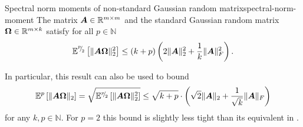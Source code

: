 \documentclass[12pt]{article}
\begin{document}
\begin{lemma}{Spectral norm moments of non-standard Gaussian random matrix}{spectral-norm-moment}
    The matrix $\boldsymbol{A} \in \mathbb{R}^{m \times m}$ and the standard Gaussian random matrix $\boldsymbol{\Omega} \in \mathbb{R}^{m \times k}$ satisfy for all $p \in \mathbb{N}$ 
    \begin{equation}
        \mathbb{E}^{{}^{p}{\mskip -5mu/\mskip -3mu}_{2}}\left[ \lVert \boldsymbol{A} \boldsymbol{\Omega} \rVert _2^2 \right]
        \leq  (k + p) \left( 2 \lVert \boldsymbol{A} \rVert _2^2 + \frac{1}{k} \lVert \boldsymbol{A} \rVert _F^2 \right).
    \end{equation}
\end{lemma}

\begin{remark}
    In particular, this result can also be used to bound
    \begin{equation}
        \mathbb{E}^{p}\left[ \lVert \boldsymbol{A} \boldsymbol{\Omega} \rVert _2 \right] = \sqrt{\mathbb{E}^{{}^{p}{\mskip -5mu/\mskip -3mu}_{2}}\left[ \lVert \boldsymbol{A} \boldsymbol{\Omega} \rVert _2^2 \right]} \leq \sqrt{k + p} \cdot \left(\sqrt{2} \lVert \boldsymbol{A} \rVert _2 + \frac{1}{\sqrt{k}}\lVert \boldsymbol{A} \rVert _F\right)
    \end{equation}
    for any $k,p \in \mathbb{N}$. For $p=2$ this bound is slightly less tight than its equivalent in \cite[Lemma B.1]{tropp-2023-randomized-algorithms}.
\end{remark}
\end{document}
